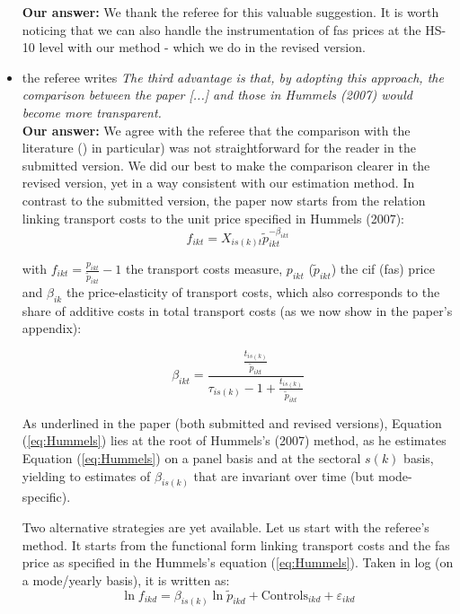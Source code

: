 \documentclass[a4paper,12pt]{article}
\begin{document}
\begin{itemize}
     \textbf{Our answer:}
We thank the referee for this valuable suggestion. It is worth noticing that we can also handle the instrumentation of fas prices at the HS-10 level with our method - which we do in the revised version.


\item the referee writes \textit{The third advantage is that, by adopting this approach, the comparison between the paper [...] and those in Hummels (2007) would become more transparent.}\\
     \textbf{Our answer:}
     We agree with the referee that the comparison with the literature (\citealp{hummels2007}) in particular) was not straightforward for the reader in the submitted version. We did our best to make the comparison clearer in the revised version, yet in a way consistent with our estimation method. In contrast to the submitted version, the paper now starts from the relation linking transport costs to the unit price specified in Hummels (2007):
    \begin{equation}
    f_{ikt} = X_{is(k)t}\widetilde{p}_{ikt}^{-\beta_{ikt}} \label{eq:Hummels}
    \end{equation}

     with $f_{ikt} = \frac{p_{ikt}}{\widetilde{p}_{ikt}} -1 $ the transport costs measure, $p_{ikt}$ ($\widetilde{p}_{ikt}$) the cif (fas) price and $\beta_{ik}$ the price-elasticity of transport costs, which also corresponds to the share of additive costs in total transport costs (as we now show in the paper's appendix):

     \begin{equation}
     \beta_{ikt} = \frac{\frac{t_{is(k)}}{\widetilde{p}_{ikt}}}{\tau_{is(k)}-1+\frac{t_{is(k)}}{\widetilde{p}_{ikt}} } \label{eq:beta_TC}
     \end{equation}

     As underlined in the paper (both submitted and revised versions), Equation (\ref{eq:Hummels}) lies at the root of Hummels's (2007) method, as he estimates Equation (\ref{eq:Hummels}) on a panel basis and at the sectoral $s(k)$ basis, yielding to estimates of $\beta_{is(k)}$ that are invariant over time (but mode-specific).

     Two alternative strategies are yet available. Let us start with the referee's method. It starts from the functional form linking transport costs and the fas price as specified in the Hummels's equation (\ref{eq:Hummels}). Taken in log (on a mode/yearly basis), it is written as:
     $$\ln f_{ikd} = \beta_{is(k)}\ln \widetilde{p}_{ikd} +\text{Controls}_{ikd}+ \varepsilon_{ikd}$$


\end{itemize}
\end{document}
